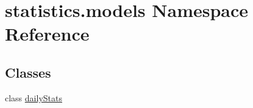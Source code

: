\hypertarget{namespacestatistics_1_1models}{}\section{statistics.\+models Namespace Reference}
\label{namespacestatistics_1_1models}
\subsection*{Classes}
\begin{DoxyCompactItemize}
\item 
class \hyperlink{classstatistics_1_1models_1_1dailyStats}{daily\+Stats}
\end{DoxyCompactItemize}
